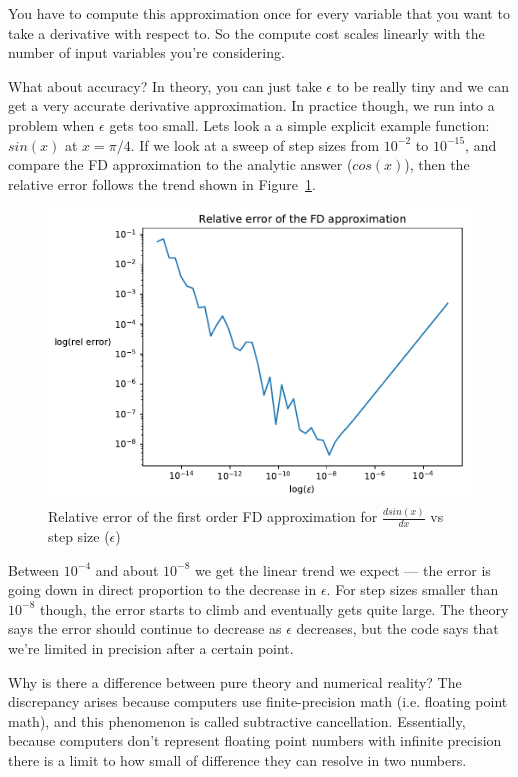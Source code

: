 \documentclass[conf]{new-aiaa}
\begin{document}
    You have to compute this approximation once for every variable that you want to take a derivative with respect to. 
    So the compute cost scales linearly with the number of input variables you're considering. 

    What about accuracy?
    In theory, you can just take $\epsilon$ to be really tiny and we can get a very accurate derivative approximation. 
    In practice though, we run into a problem when $\epsilon$ gets too small.
    Lets look a a simple explicit example function: $sin(x)$ at $x=\pi/4$.
    If we look at a sweep of step sizes from $10^{-2}$ to $10^{-15}$, and compare the FD approximation to the analytic answer ($cos(x)$), 
    then the relative error follows the trend shown in Figure~\ref{fig:fd_subtractive_cancellation}.
    \begin{figure}[H]
        \centering
        
        \includegraphics[width=.75\textwidth]{sin_fd.pdf}
        \caption{Relative error of the first order FD approximation for $\frac{d sin(x)}{dx}$ vs step size ($\epsilon$)}
        \label{fig:fd_subtractive_cancellation}
    \end{figure}
    Between $10^{-4}$ and about $10^{-8}$ we get the linear trend we expect --- the error is going down in direct proportion to the decrease in $\epsilon$. 
    For step sizes smaller than $10^{-8}$ though, the error starts to climb and eventually gets quite large. 
    The theory says the error should continue to decrease as $\epsilon$ decreases, 
    but the code says that we're limited in precision after a certain point. 

    Why is there a difference between pure theory and numerical reality? 
    The discrepancy arises because computers use finite-precision math (i.e. floating point math), 
    and this phenomenon is called subtractive cancellation. 
    Essentially, because computers don't represent floating point numbers with infinite precision there is a limit to how small of difference they can resolve in two numbers. 
\end{document}

